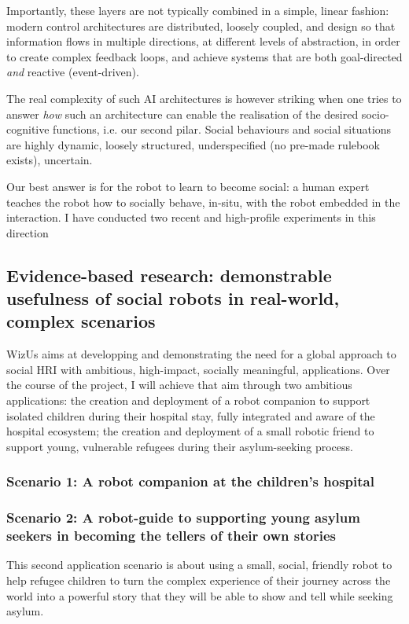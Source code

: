 \documentclass[11pt]{article}
\newcommand{\project}{WizUs\xspace}
\begin{document}
Importantly, these layers are not typically combined in a simple, linear
fashion: modern control architectures are distributed, loosely coupled, and
design so that information flows in multiple directions, at different levels of
abstraction, in order to create complex feedback loops, and achieve systems that are
both goal-directed \emph{and} reactive (event-driven).


The real complexity of such AI architectures is however striking when one tries
to answer \emph{how} such an architecture can enable the realisation of the
desired socio-cognitive functions, i.e. our second pilar. Social behaviours and
social situations are highly dynamic, loosely structured, underspecified (no
pre-made rulebook exists), uncertain.

Our best answer is for the robot to learn to become social: a human expert teaches
the robot how to socially behave, in-situ, with the robot embedded in the
interaction. I have conducted two recent and high-profile experiments in this
direction

\subsection{Evidence-based research: demonstrable usefulness of social robots in
real-world, complex scenarios}

\project aims at developping and demonstrating the need for a global approach to
social HRI with ambitious, high-impact, socially meaningful, applications. Over
the course of the project, I will achieve that aim through two ambitious
applications: the creation and deployment of a robot companion to support
isolated children during their hospital stay, fully integrated and aware of the
hospital ecosystem; the creation and deployment of a small robotic friend to
support young, vulnerable refugees during their asylum-seeking process.

\subsubsection{Scenario 1: A robot companion at the children's hospital}

\subsubsection{Scenario 2: A robot-guide to supporting young asylum seekers in
becoming the tellers of their own stories}

This second application scenario is about using a small, social, friendly robot
to help refugee children to turn the complex experience of their journey across
the world into a powerful story that they will be able to show and tell while
seeking asylum.
\end{document}
